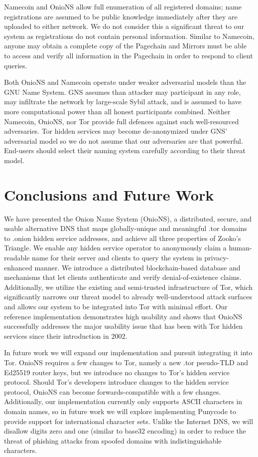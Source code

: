 \documentclass[conference]{IEEEtran}
\begin{document}
Namecoin and OnioNS allow full enumeration of all registered domains; name registrations are assumed to be public knowledge immediately after they are uploaded to either network. We do not consider this a significant threat to our system as registrations do not contain personal information. Similar to Namecoin, anyone may obtain a complete copy of the Pagechain and Mirrors must be able to access and verify all information in the Pagechain in order to respond to client queries.

Both OnioNS and Namecoin operate under weaker adversarial models than the GNU Name System. GNS assumes than attacker may participant in any role, may infiltrate the network by large-scale Sybil attack, and is assumed to have more computational power than all honest participants combined. Neither Namecoin, OnioNS, nor Tor provide full defences against such well-resourced adversaries. Tor hidden services may become de-anonymized under GNS' adversarial model so we do not assume that our adversaries are that powerful. End-users should select their naming system carefully according to their threat model.

\section{Conclusions and Future Work}

We have presented the Onion Name System (OnioNS), a distributed, secure, and usable alternative DNS that maps globally-unique and meaningful .tor domains to .onion hidden service addresses, and achieve all three properties of Zooko's Triangle. We enable any hidden service operator to anonymously claim a human-readable name for their server and clients to query the system in privacy-enhanced manner. We introduce a distributed blockchain-based database and mechanisms that let clients authenticate and verify denial-of-existence claims. Additionally, we utilize the existing and semi-trusted infrastructure of Tor, which significantly narrows our threat model to already well-understood attack surfaces and allows our system to be integrated into Tor with minimal effort. Our reference implementation demonstrates high usability and shows that OnioNS successfully addresses the major usability issue that has been with Tor hidden services since their introduction in 2002.

In future work we will expand our implementation and pursuit integrating it into Tor. OnioNS requires a few changes to Tor, namely a new .tor pseudo-TLD and Ed25519 router keys, but we introduce no changes to Tor's hidden service protocol. Should Tor's developers introduce changes to the hidden service protocol, OnioNS can become forwards-compatible with a few changes. Additionally, our implementation currently only supports ASCII characters in domain names, so in future work we will explore implementing Punycode to provide support for international character sets. Unlike the Internet DNS, we will disallow digits zero and one (similar to base32 encoding) in order to reduce the threat of phishing attacks from spoofed domains with indistinguishable characters.
\end{document}
